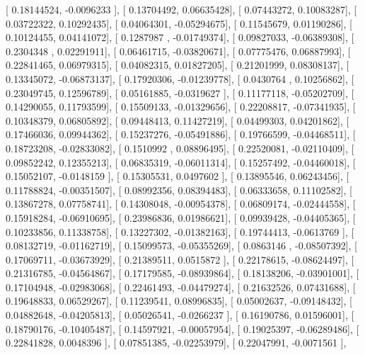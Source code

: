 \documentclass{article}
\begin{document}
       [ 0.18144524, -0.0096233 ],
       [ 0.13704492,  0.06635428],
       [ 0.07443272,  0.10083287],
       [ 0.03722322,  0.10292435],
       [ 0.04064301, -0.05294675],
       [ 0.11545679,  0.01190286],
       [ 0.10124455,  0.04141072],
       [ 0.1287987 , -0.01749374],
       [ 0.09827033, -0.06389308],
       [ 0.2304348 ,  0.02291911],
       [ 0.06461715, -0.03820671],
       [ 0.07775476,  0.06887993],
       [ 0.22841465,  0.06979315],
       [ 0.04082315,  0.01827205],
       [ 0.21201999,  0.08308137],
       [ 0.13345072, -0.06873137],
       [ 0.17920306, -0.01239778],
       [ 0.0430764 ,  0.10256862],
       [ 0.23049745,  0.12596789],
       [ 0.05161885, -0.0319627 ],
       [ 0.11177118, -0.05202709],
       [ 0.14290055,  0.11793599],
       [ 0.15509133, -0.01329656],
       [ 0.22208817, -0.07341935],
       [ 0.10348379,  0.06805892],
       [ 0.09448413,  0.11427219],
       [ 0.04499303,  0.04201862],
       [ 0.17466036,  0.09944362],
       [ 0.15237276, -0.05491886],
       [ 0.19766599, -0.04468511],
       [ 0.18723208, -0.02833082],
       [ 0.1510992 ,  0.08896495],
       [ 0.22520081, -0.02110409],
       [ 0.09852242,  0.12355213],
       [ 0.06835319, -0.06011314],
       [ 0.15257492, -0.04460018],
       [ 0.15052107, -0.0148159 ],
       [ 0.15305531,  0.0497602 ],
       [ 0.13895546,  0.06243456],
       [ 0.11788824, -0.00351507],
       [ 0.08992356,  0.08394483],
       [ 0.06333658,  0.11102582],
       [ 0.13867278,  0.07758741],
       [ 0.14308048, -0.00954378],
       [ 0.06809174, -0.02444558],
       [ 0.15918284, -0.06910695],
       [ 0.23986836,  0.01986621],
       [ 0.09939428, -0.04405365],
       [ 0.10233856,  0.11338758],
       [ 0.13227302, -0.01382163],
       [ 0.19744413, -0.0613769 ],
       [ 0.08132719, -0.01162719],
       [ 0.15099573, -0.05355269],
       [ 0.0863146 , -0.08507392],
       [ 0.17069711, -0.03673929],
       [ 0.21389511,  0.0515872 ],
       [ 0.22178615, -0.08624497],
       [ 0.21316785, -0.04564867],
       [ 0.17179585, -0.08939864],
       [ 0.18138206, -0.03901001],
       [ 0.17104948, -0.02983068],
       [ 0.22461493, -0.04479274],
       [ 0.21632526,  0.07431688],
       [ 0.19648833,  0.06529267],
       [ 0.11239541,  0.08996835],
       [ 0.05002637, -0.09148432],
       [ 0.04882648, -0.04205813],
       [ 0.05026541, -0.0266237 ],
       [ 0.16190786,  0.01596001],
       [ 0.18790176, -0.10405487],
       [ 0.14597921, -0.00057954],
       [ 0.19025397, -0.06289486],
       [ 0.22841828,  0.0048396 ],
       [ 0.07851385, -0.02253979],
       [ 0.22047991, -0.0071561 ],
\end{document}
